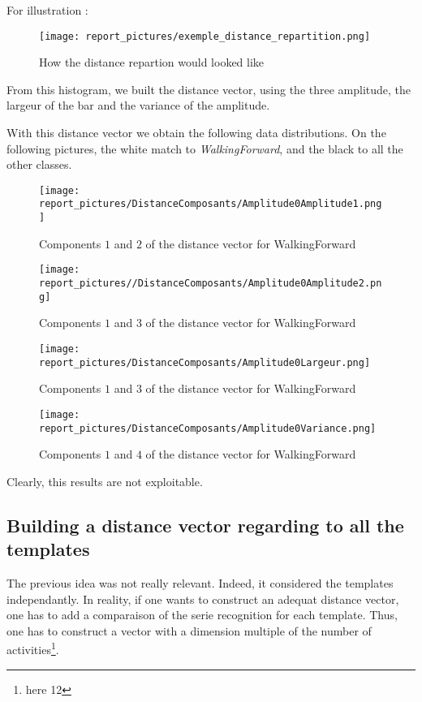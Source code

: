 \documentclass[a4,12pt]{article}
\begin{document}
	For illustration :
	
	\begin{figure}[H]
		\centering
		\texttt{[image: report\_pictures/exemple\_distance\_repartition.png]}
		\caption{How the distance repartion would looked like}
		\label{ex_dist_rep}
	\end{figure}
	
	From this histogram, we built the distance vector, using the three amplitude, the largeur of the bar and the variance of the amplitude.
	
	With this distance vector we obtain the following data distributions. On the following pictures, the white match to \textit{WalkingForward}, and the black to all the other classes.
	
	
	\begin{figure}[H]
		\centering
		\texttt{[image: report\_pictures/DistanceComposants/Amplitude0Amplitude1.png]}
		\caption{Components $1$ and $2$ of the distance vector for WalkingForward}
		\label{dist_components}
	\end{figure}

	\begin{figure}[H]
		\centering
		\texttt{[image: report\_pictures//DistanceComposants/Amplitude0Amplitude2.png]}
		\caption{Components $1$ and $3$ of the distance vector for WalkingForward}
		\label{dist_components}
	\end{figure}
	
	\begin{figure}[H]
		\centering
		\texttt{[image: report\_pictures/DistanceComposants/Amplitude0Largeur.png]}
		\caption{Components $1$ and $3$ of the distance vector for WalkingForward}
		\label{dist_components}
	\end{figure}
	
	\begin{figure}[H]
		\centering
		\texttt{[image: report\_pictures/DistanceComposants/Amplitude0Variance.png]}
		\caption{Components $1$ and $4$ of the distance vector for WalkingForward}
		\label{dist_components}
	\end{figure}
	
	Clearly, this results are not exploitable. 
	
	\subsection{Building a distance vector regarding to all the templates}
	
	The previous idea was not really relevant. Indeed, it considered the templates independantly. In reality, if one wants to construct an adequat distance vector, one has to add a comparaison of the serie recognition for each template. Thus, one has to construct a vector with a dimension multiple of the number of activities\footnote{here 12}.
	
\end{document}
